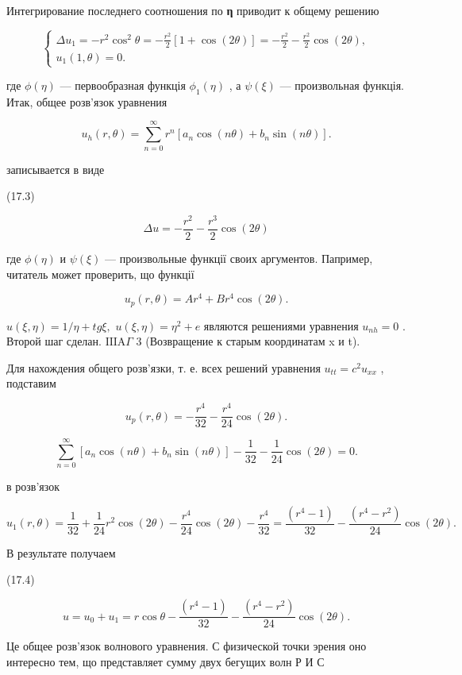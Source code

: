 \documentclass[
  ukrainian,
]{article}
\begin{document}
Интегрирование последнего соотношения по \textbf{η} приводит к общему
решению

\[
\begin{cases} \Delta u_{1} = -r^{2} \cos^{2} \theta = -\frac{r^{2}}{2} \left[1 + \cos(2\theta)\right] = -\frac{r^{2}}{2} - \frac{r^{2}}{2} \cos(2\theta), \\ u_{1}(1, \theta) = 0. \end{cases}
\]

где \(\phi(\eta)\) --- первообразная функція \(\phi_1(\eta)\) , а
\(\psi(\xi)\) --- произвольная функція. Итак, общее розв'язок уравнения

\[
u_h(r, \theta) = \sum_{n=0}^{\infty} r^n [a_n \cos(n\theta) + b_n \sin(n\theta)].
\]

записывается в виде

(17.3)

\[
\Delta u = -\frac{r^2}{2} - \frac{r^3}{2} \cos{(2\theta)}
\]

где \(\phi(\eta)\) и \(\psi(\xi)\) --- произвольные функції своих
аргументов. Папример, читатель может проверить, що функції

\[
u_p(r, \theta) = Ar^4 + Br^4 \cos(2\theta).
\]

\(u(\xi, \eta) = 1/\eta + tg \xi,\) \(u(\xi, \eta) = \eta^2 + e\)
являются решениями уравнения \(u_{\mathrm{ }nh}=0\) . Второй шаг сделан.
\(\text{IIIA}\Gamma\) 3 (Возвращение к старым координатам x и t).

Для нахождения общего розв'язки, т. е. всех решений уравнения
\(u_{tt} = c^2 u_{xx}\) , подставим

\[
u_p(r, \theta) = -\frac{r^4}{32} - \frac{r^4}{24} \cos(2\theta).
\]

\[
\sum_{n=0}^{\infty} [a_n \cos(n\theta) + b_n \sin(n\theta)] - \frac{1}{32} - \frac{1}{24} \cos(2\theta) = 0.
\]

в розв'язок

\[
u_1(r, \theta) = \frac{1}{32} + \frac{1}{24}r^2\cos(2\theta) - \frac{r^4}{24}\cos(2\theta) - \frac{r^4}{32} = \frac{(r^4 - 1)}{32} - \frac{(r^4 - r^2)}{24}\cos(2\theta).
\]

В результате получаем

(17.4)

\[
u = u_0 + u_1 = r \cos \theta - \frac{(r^4 - 1)}{32} - \frac{(r^4 - r^2)}{24} \cos (2\theta).
\]

Це общее розв'язок волнового уравнения. С физической точки эрения оно
интересно тем, що представляет сумму двух бегущих волн Р И С
\end{document}
